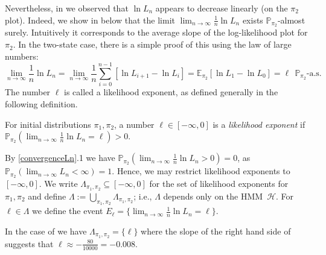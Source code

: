 \documentclass[a4paper,UKenglish,cleveref, autoref,mathscr]{lipics-v2019}
\newcommand{\EE}{\mathbb{E}}
\newcommand{\PP}{\mathbb{P}}
\newcommand{\1}{\mathbbm{1}}
\newcommand{\liexp}{\lim_{n\rightarrow\infty} \frac1n \ln L_n}
\renewcommand{\H}{\mathcal{H}}
\begin{document}
Nevertheless, in  we observed that $\ln L_n$ appears to decrease linearly (on the $\pi_2$ plot).
Indeed, we show in  below that the limit $\liexp$ exists $\PP_{\pi_2}$-almost surely.
Intuitively it corresponds to the average slope of the log-likelihood plot for $\pi_2$.
In the two-state case, there is a simple proof of this using the law of large numbers:
\begin{equation*}
\liexp = \lim_{n \rightarrow \infty}\frac1n \sum_{i = 0}^{n - 1} [\ln L_{i + 1} - \ln L_i ] = \EE_{\pi_2} [\ln L_1 - \ln L_0] = \ell \ \ \PP_{\pi_2}\text{-a.s.}
\end{equation*}
The number $\ell$ is called a likelihood exponent, as defined generally in the following definition.
\begin{definition}
For initial distributions $\pi_1, \pi_2$, a number $\ell \in [-\infty, 0]$ is a \emph{likelihood exponent} if $\PP_{\pi_2}(\liexp = \ell) > 0$.
\end{definition}
By \cref{convergenceLn}.1 we have $\PP_{\pi_2}(\liexp > 0) = 0$, as $\PP_{\pi_2}(\lim_{n \rightarrow \infty} L_n < \infty) = 1$. Hence, we may restrict likelihood exponents to~$[-\infty, 0]$.
%
We write $\Lambda_{\pi_1, \pi_2} \subseteq [-\infty,0]$ for the set of likelihood exponents for $\pi_1, \pi_2$ and define $\Lambda := \bigcup_{\pi_1, \pi_2} \Lambda_{\pi_1, \pi_2}$; i.e., $\Lambda$ depends only on the HMM~$\H$.
For $\ell \in \Lambda$ we define the event $E_\ell = \{\liexp = \ell\}$.

\begin{example}\label{estimatingsleepcyclelikelihood}
In the case of  we have $\Lambda_{\pi_1, \pi_2} = \{\ell\}$ where the slope of the right hand side of  suggests that $\ell \approx -\frac{80}{10000} = -0.008$.
\end{example}
\end{document}
